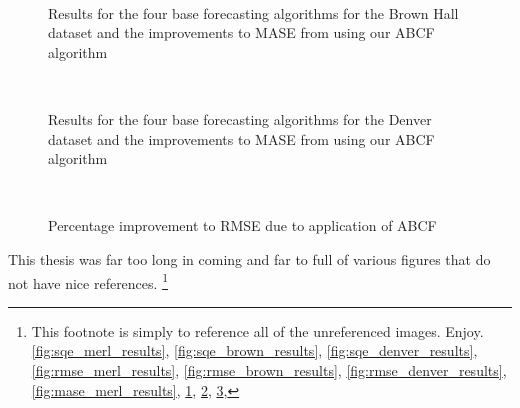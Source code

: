 \begin{figure}[!b]
	\begin{center}
		 \\
	\end{center}
	\caption{Results for the four base forecasting algorithms for the Brown Hall dataset and the improvements to MASE from using our ABCF algorithm}
	\label{fig:mase_brown_results}
\end{figure}

\begin{figure}[!t]
	\begin{center}
		 \\
	\end{center}
	\caption{Results for the four base forecasting algorithms for the Denver dataset and the improvements to MASE from using our ABCF algorithm}
	\label{fig:mase_denver_results}
\end{figure}


\begin{figure}[!b]
	\begin{center}
		 \\
	\end{center}
	\caption{Percentage improvement to RMSE due to application of ABCF}
	\label{fig:rmse_improvement_dataset}
\end{figure}


\label{app:references}
This thesis was far too long in coming and far to full of various figures that do not have nice references.  
	\footnote{This footnote is simply to reference all of the unreferenced images.  Enjoy.
		\ref{fig:sqe_merl_results},
		\ref{fig:sqe_brown_results},
		\ref{fig:sqe_denver_results},
		\ref{fig:rmse_merl_results},
		\ref{fig:rmse_brown_results},
		\ref{fig:rmse_denver_results},
		\ref{fig:mase_merl_results},
		\ref{fig:mase_brown_results},
		\ref{fig:mase_denver_results},
		\ref{fig:rmse_improvement_dataset},
	}